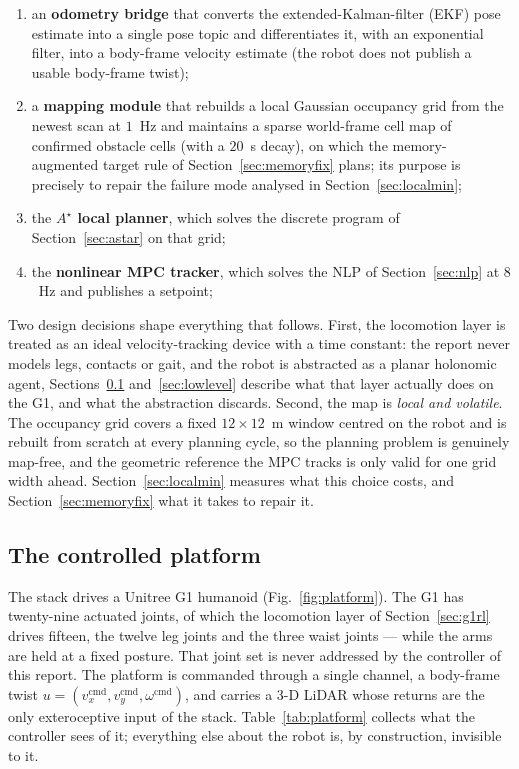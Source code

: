 \documentclass[11pt,a4paper]{article}
\newcommand{\astar}{$A^\star$}
\begin{document}
\begin{enumerate}[label=\arabic*.]
  \item an \textbf{odometry bridge} that converts the extended-Kalman-filter (EKF) pose estimate into a
        single pose topic and differentiates it, with an exponential filter, into a body-frame velocity estimate (the robot does
        not publish a usable body-frame twist);
  \item a \textbf{mapping module} that rebuilds a local Gaussian occupancy grid from the newest scan at
        $1$~Hz and maintains a sparse world-frame cell map of confirmed obstacle cells (with a $20$~s
        decay), on which the memory-augmented target rule of Section~\ref{sec:memoryfix} plans; its purpose
        is precisely to repair the failure mode analysed in Section~\ref{sec:localmin};
  \item the \textbf{\astar{} local planner}, which solves the discrete program of
        Section~\ref{sec:astar} on that grid;
  \item the \textbf{nonlinear MPC tracker}, which solves the NLP of Section~\ref{sec:nlp} at $8$~Hz and
        publishes a setpoint;
\end{enumerate}

Two design decisions shape everything that follows. First, the locomotion layer is treated as an ideal
velocity-tracking device with a time constant: the report never models legs, contacts or gait, and the robot
is abstracted as a planar holonomic agent, Sections~\ref{sec:platforms} and~\ref{sec:lowlevel} describe
what that layer actually does on the G1, and what the abstraction discards. Second, the map is \emph{local and
volatile}. The occupancy grid covers a fixed $12\times12$~m window centred on the robot and is rebuilt from
scratch at every planning cycle, so the planning problem is genuinely map-free, and the geometric reference
the MPC tracks is only valid for one grid width ahead. Section~\ref{sec:localmin} measures what this choice
costs, and Section~\ref{sec:memoryfix} what it takes to repair it.

\subsection{The controlled platform}
\label{sec:platforms}

The stack drives a Unitree G1 humanoid (Fig.~\ref{fig:platform}). The G1 has twenty-nine actuated joints, of
which the locomotion layer of Section~\ref{sec:g1rl} drives fifteen, the twelve leg joints and the three
waist joints --- while the arms are held at a fixed posture. That joint set is never addressed by the
controller of this report. The platform is commanded through a single channel, a body-frame twist
$u=(v_x^{\mathrm{cmd}},v_y^{\mathrm{cmd}},\omega^{\mathrm{cmd}})$, and carries a 3-D LiDAR whose returns
are the only exteroceptive input of the stack. Table~\ref{tab:platform} collects what the controller sees of
it; everything else about the robot is, by construction, invisible to it.
\end{document}
